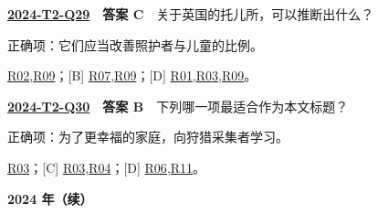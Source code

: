 \documentclass[11pt,a4paper]{article}
\begin{document}
\par\smallskip
{}\label{idx-2024-T2-Q29}
\noindent\textbf{\href{https://zj139.github.io/math-notes/english/218043887c082e92ea2ba140/\#q29}{2024-T2-Q29}　答案 C}　关于英国的托儿所，可以推断出什么？\par\nopagebreak
\noindent 正确项：它们应当改善照护者与儿童的比例。\par\nopagebreak
\noindent [A] \hyperref[cat-R02]{R02},\hyperref[cat-R09]{R09}；[B] \hyperref[cat-R07]{R07},\hyperref[cat-R09]{R09}；[D] \hyperref[cat-R01]{R01},\hyperref[cat-R03]{R03},\hyperref[cat-R09]{R09}。
\par\smallskip
{}\label{idx-2024-T2-Q30}
\noindent\textbf{\href{https://zj139.github.io/math-notes/english/218043887c082e92ea2ba140/\#q30}{2024-T2-Q30}　答案 B}　下列哪一项最适合作为本文标题？\par\nopagebreak
\noindent 正确项：为了更幸福的家庭，向狩猎采集者学习。\par\nopagebreak
\noindent [A] \hyperref[cat-R03]{R03}；[C] \hyperref[cat-R03]{R03},\hyperref[cat-R04]{R04}；[D] \hyperref[cat-R06]{R06},\hyperref[cat-R11]{R11}。
\par\smallskip
\clearpage\noindent\textbf{2024 年（续）}\par
\end{document}
